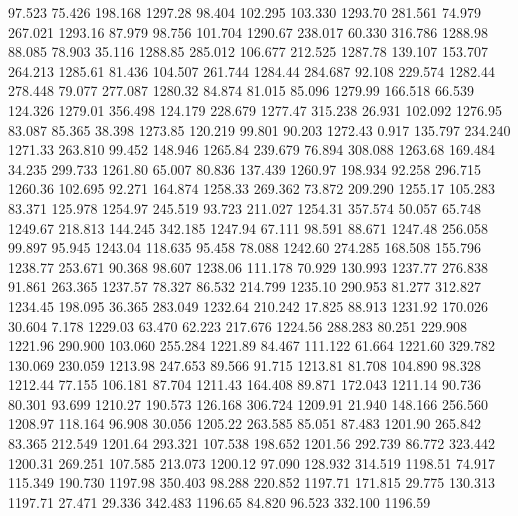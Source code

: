   97.523   75.426  198.168      1297.28
  98.404  102.295  103.330      1293.70
 281.561   74.979  267.021      1293.16
  87.979   98.756  101.704      1290.67
 238.017   60.330  316.786      1288.98
  88.085   78.903   35.116      1288.85
 285.012  106.677  212.525      1287.78
 139.107  153.707  264.213      1285.61
  81.436  104.507  261.744      1284.44
 284.687   92.108  229.574      1282.44
 278.448   79.077  277.087      1280.32
  84.874   81.015   85.096      1279.99
 166.518   66.539  124.326      1279.01
 356.498  124.179  228.679      1277.47
 315.238   26.931  102.092      1276.95
  83.087   85.365   38.398      1273.85
 120.219   99.801   90.203      1272.43
   0.917  135.797  234.240      1271.33
 263.810   99.452  148.946      1265.84
 239.679   76.894  308.088      1263.68
 169.484   34.235  299.733      1261.80
  65.007   80.836  137.439      1260.97
 198.934   92.258  296.715      1260.36
 102.695   92.271  164.874      1258.33
 269.362   73.872  209.290      1255.17
 105.283   83.371  125.978      1254.97
 245.519   93.723  211.027      1254.31
 357.574   50.057   65.748      1249.67
 218.813  144.245  342.185      1247.94
  67.111   98.591   88.671      1247.48
 256.058   99.897   95.945      1243.04
 118.635   95.458   78.088      1242.60
 274.285  168.508  155.796      1238.77
 253.671   90.368   98.607      1238.06
 111.178   70.929  130.993      1237.77
 276.838   91.861  263.365      1237.57
  78.327   86.532  214.799      1235.10
 290.953   81.277  312.827      1234.45
 198.095   36.365  283.049      1232.64
 210.242   17.825   88.913      1231.92
 170.026   30.604    7.178      1229.03
  63.470   62.223  217.676      1224.56
 288.283   80.251  229.908      1221.96
 290.900  103.060  255.284      1221.89
  84.467  111.122   61.664      1221.60
 329.782  130.069  230.059      1213.98
 247.653   89.566   91.715      1213.81
  81.708  104.890   98.328      1212.44
  77.155  106.181   87.704      1211.43
 164.408   89.871  172.043      1211.14
  90.736   80.301   93.699      1210.27
 190.573  126.168  306.724      1209.91
  21.940  148.166  256.560      1208.97
 118.164   96.908   30.056      1205.22
 263.585   85.051   87.483      1201.90
 265.842   83.365  212.549      1201.64
 293.321  107.538  198.652      1201.56
 292.739   86.772  323.442      1200.31
 269.251  107.585  213.073      1200.12
  97.090  128.932  314.519      1198.51
  74.917  115.349  190.730      1197.98
 350.403   98.288  220.852      1197.71
 171.815   29.775  130.313      1197.71
  27.471   29.336  342.483      1196.65
  84.820   96.523  332.100      1196.59

